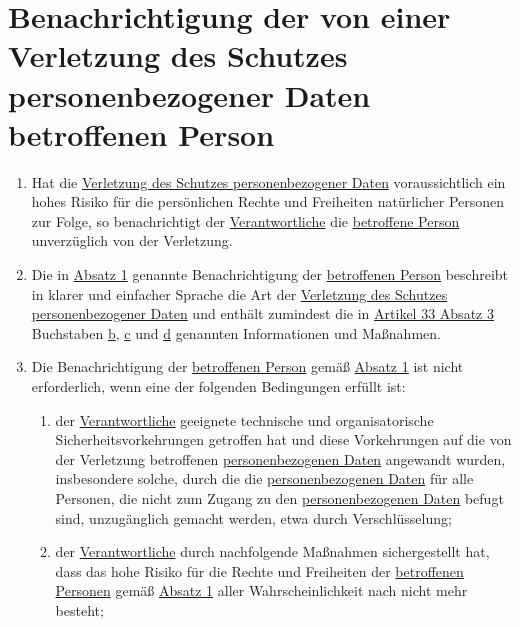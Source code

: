 \chapter{Benachrichtigung der von einer Verletzung des Schutzes personenbezogener Daten betroffenen Person}
\label{ch:34}


\begin{enumerate}

  \item Hat die \hyperref[itm:04-12]{Verletzung des Schutzes personenbezogener Daten} voraussichtlich ein hohes Risiko für die persönlichen
   Rechte und Freiheiten natürlicher Personen zur Folge, so benachrichtigt der \hyperref[itm:04-7]{Verantwortliche} die \hyperref[itm:04-1]{betroffene Person}
   unverzüglich von der Verletzung.
  \label{itm:34-1}

  \item Die in \hyperref[itm:34-1]{Absatz 1} genannte Benachrichtigung der \hyperref[itm:04-1]{betroffenen Person} beschreibt in klarer und
   einfacher Sprache die Art der \hyperref[itm:04-12]{Verletzung des Schutzes personenbezogener Daten} und enthält zumindest die in
   \hyperref[itm:33-3]{Artikel 33 Absatz 3} Buchstaben \hyperref[itm:33-3b]{b}, \hyperref[itm:33-3c]{c} und \hyperref
    [itm:33-3d]{d} genannten Informationen und Maßnahmen.
  \label{itm:34-2}

  \item Die Benachrichtigung der \hyperref[itm:04-1]{betroffenen Person} gemäß \hyperref[itm:34-1]{Absatz 1} ist nicht erforderlich, wenn eine der folgenden
   Bedingungen erfüllt ist:
  \label{itm:34-3}

  \begin{enumerate}
  
    \item der \hyperref[itm:04-7]{Verantwortliche} geeignete technische und organisatorische Sicherheitsvorkehrungen getroffen hat und diese
     Vorkehrungen auf die von der Verletzung betroffenen \hyperref[itm:04-1]{personenbezogenen Daten} angewandt wurden, insbesondere solche,
     durch die die \hyperref[itm:04-1]{personenbezogenen Daten} für alle Personen, die nicht zum Zugang zu den \hyperref[itm:04-1]{personenbezogenen Daten}
     befugt sind, unzugänglich gemacht werden, etwa durch Verschlüsselung;
    \label{itm:34-3a}

    \item der \hyperref[itm:04-7]{Verantwortliche} durch nachfolgende Maßnahmen sichergestellt hat, dass das hohe Risiko für die Rechte und
     Freiheiten der \hyperref[itm:04-1]{betroffenen Personen} gemäß \hyperref[itm:34-1]{Absatz 1} aller Wahrscheinlichkeit nach nicht mehr
     besteht;
    \label{itm:34-3b}


\end{enumerate}
\end{enumerate}
